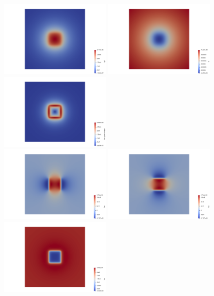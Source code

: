 \begin{center}
\includegraphics[width=5.3cm]{python_codes/fieldstone_84/arct15/g.png}
\includegraphics[width=5.3cm]{python_codes/fieldstone_84/arct15/U.png}
\includegraphics[width=5.3cm]{python_codes/fieldstone_84/arct15/horgrad.png}\\
\includegraphics[width=5.3cm]{python_codes/fieldstone_84/arct15/Txx}
\includegraphics[width=5.3cm]{python_codes/fieldstone_84/arct15/Tyy}
\includegraphics[width=5.3cm]{python_codes/fieldstone_84/arct15/Tzz}\\

\end{center}

